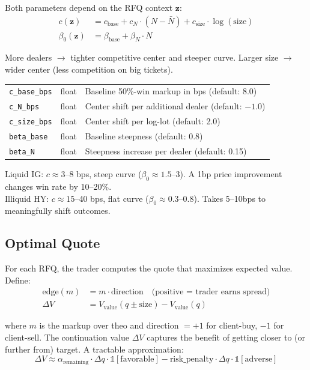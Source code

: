 \documentclass[11pt,a4paper]{article}
\begin{document}
Both parameters depend on the RFQ context $\mathbf{z}$:
\begin{align}
c(\mathbf{z}) &= c_{\text{base}} + c_N \cdot (N - \bar{N}) + c_{\text{size}} \cdot \log(\text{size}) \\[4pt]
\beta_0(\mathbf{z}) &= \beta_{\text{base}} + \beta_N \cdot N
\end{align}

More dealers $\to$ tighter competitive center and steeper curve. Larger size $\to$ wider center (less competition on big tickets).

\begin{parambox}[Knobs]
\begin{tabular}{@{}lll@{}}
\texttt{c\_base\_bps} & float & Baseline 50\%-win markup in bps (default: 8.0) \\
\texttt{c\_N\_bps} & float & Center shift per additional dealer (default: $-1.0$) \\
\texttt{c\_size\_bps} & float & Center shift per log-lot (default: 2.0) \\
\texttt{beta\_base} & float & Baseline steepness (default: 0.8) \\
\texttt{beta\_N} & float & Steepness increase per dealer (default: 0.15) \\
\end{tabular}
\end{parambox}

\begin{specbox}
Liquid IG: $c \approx 3$--8 bps, steep curve ($\beta_0 \approx 1.5$--3). A 1bp price improvement changes win rate by 10--20\%.\\
Illiquid HY: $c \approx 15$--40 bps, flat curve ($\beta_0 \approx 0.3$--0.8). Takes 5--10bps to meaningfully shift outcomes.
\end{specbox}

\subsection{Optimal Quote}

For each RFQ, the trader computes the quote that maximizes expected value. Define:
\begin{align}
\text{edge}(m) &= m \cdot \text{direction} \quad \text{(positive = trader earns spread)} \\
\Delta V &= V_{\text{value}}(q \pm \text{size}) - V_{\text{value}}(q) \label{eq:contval}
\end{align}

where $m$ is the markup over theo and direction $= +1$ for client-buy, $-1$ for client-sell. The continuation value $\Delta V$ captures the benefit of getting closer to (or further from) target. A tractable approximation:
\begin{equation}
\Delta V \approx \alpha_{\text{remaining}} \cdot \Delta q \cdot \mathbb{1}[\text{favorable}] - \text{risk\_penalty} \cdot \Delta q \cdot \mathbb{1}[\text{adverse}]
\end{equation}
\end{document}
